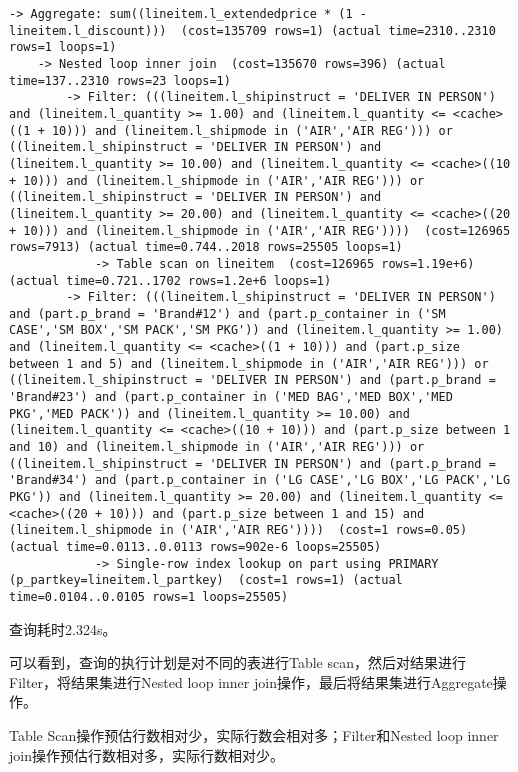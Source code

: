 \documentclass{article}
\begin{document}
\begin{lstlisting}
-> Aggregate: sum((lineitem.l_extendedprice * (1 - lineitem.l_discount)))  (cost=135709 rows=1) (actual time=2310..2310 rows=1 loops=1)
    -> Nested loop inner join  (cost=135670 rows=396) (actual time=137..2310 rows=23 loops=1)
        -> Filter: (((lineitem.l_shipinstruct = 'DELIVER IN PERSON') and (lineitem.l_quantity >= 1.00) and (lineitem.l_quantity <= <cache>((1 + 10))) and (lineitem.l_shipmode in ('AIR','AIR REG'))) or ((lineitem.l_shipinstruct = 'DELIVER IN PERSON') and (lineitem.l_quantity >= 10.00) and (lineitem.l_quantity <= <cache>((10 + 10))) and (lineitem.l_shipmode in ('AIR','AIR REG'))) or ((lineitem.l_shipinstruct = 'DELIVER IN PERSON') and (lineitem.l_quantity >= 20.00) and (lineitem.l_quantity <= <cache>((20 + 10))) and (lineitem.l_shipmode in ('AIR','AIR REG'))))  (cost=126965 rows=7913) (actual time=0.744..2018 rows=25505 loops=1)
            -> Table scan on lineitem  (cost=126965 rows=1.19e+6) (actual time=0.721..1702 rows=1.2e+6 loops=1)
        -> Filter: (((lineitem.l_shipinstruct = 'DELIVER IN PERSON') and (part.p_brand = 'Brand#12') and (part.p_container in ('SM CASE','SM BOX','SM PACK','SM PKG')) and (lineitem.l_quantity >= 1.00) and (lineitem.l_quantity <= <cache>((1 + 10))) and (part.p_size between 1 and 5) and (lineitem.l_shipmode in ('AIR','AIR REG'))) or ((lineitem.l_shipinstruct = 'DELIVER IN PERSON') and (part.p_brand = 'Brand#23') and (part.p_container in ('MED BAG','MED BOX','MED PKG','MED PACK')) and (lineitem.l_quantity >= 10.00) and (lineitem.l_quantity <= <cache>((10 + 10))) and (part.p_size between 1 and 10) and (lineitem.l_shipmode in ('AIR','AIR REG'))) or ((lineitem.l_shipinstruct = 'DELIVER IN PERSON') and (part.p_brand = 'Brand#34') and (part.p_container in ('LG CASE','LG BOX','LG PACK','LG PKG')) and (lineitem.l_quantity >= 20.00) and (lineitem.l_quantity <= <cache>((20 + 10))) and (part.p_size between 1 and 15) and (lineitem.l_shipmode in ('AIR','AIR REG'))))  (cost=1 rows=0.05) (actual time=0.0113..0.0113 rows=902e-6 loops=25505)
            -> Single-row index lookup on part using PRIMARY (p_partkey=lineitem.l_partkey)  (cost=1 rows=1) (actual time=0.0104..0.0105 rows=1 loops=25505)
\end{lstlisting}

查询耗时2.324s。

可以看到，查询的执行计划是对不同的表进行Table scan，然后对结果进行Filter，将结果集进行Nested loop inner join操作，最后将结果集进行Aggregate操作。

Table Scan操作预估行数相对少，实际行数会相对多；Filter和Nested loop inner join操作预估行数相对多，实际行数相对少。
\end{document}

